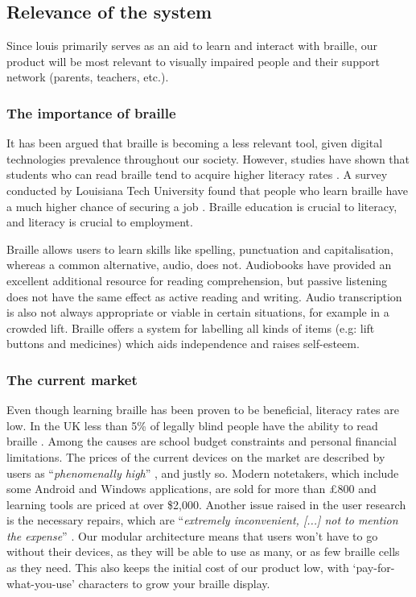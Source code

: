 \documentclass{article}
\begin{document}
\subsection{Relevance of the system} 

Since louis primarily serves as an aid to learn and interact with braille, our product will be most relevant to visually impaired people and their support network (parents, teachers, etc.).

\subsubsection{The importance of braille}

It has been argued that braille is becoming a less relevant tool, given digital technologies prevalence throughout our society. However, studies have shown that students who can read braille tend to acquire higher literacy rates \cite{earlybraille}. A survey conducted by Louisiana Tech University found that people who learn braille have a much higher chance of securing a job \cite{transformingbraille}. Braille education is crucial to literacy, and literacy is crucial to employment.

Braille allows users to learn skills like spelling, punctuation and capitalisation, whereas a common alternative, audio, does not. Audiobooks have provided an excellent additional resource for reading comprehension, but passive listening does not have the same effect as active reading and writing. Audio transcription is also not always appropriate or viable in certain situations, for example in a crowded lift. Braille offers a system for labelling all kinds of items (e.g: lift buttons and medicines) which aids independence and raises self-esteem.

\subsubsection{The current market}

Even though learning braille has been proven to be beneficial, literacy rates are low. In the UK less than 5\% of legally blind people have the ability to read braille \cite{brailleprofiling}. Among the causes are school budget constraints and personal financial limitations. The prices of the current devices on the market are described by users as ``\emph{phenomenally high}'' \cite{brailledisplays}, and justly so. Modern notetakers, which include some Android and Windows applications, are sold for more than \pounds 800 and learning tools are priced at over \$2,000. Another issue raised in the user research is the necessary repairs, which are ``\emph{extremely inconvenient, [...] not to mention the expense}'' \cite{brailledisplays}. Our modular architecture means that users won't have to go without their devices, as they will be able to use as many, or as few braille cells as they need. This also keeps the initial cost of our product low, with `pay-for-what-you-use' characters to grow your braille display.
\end{document}
